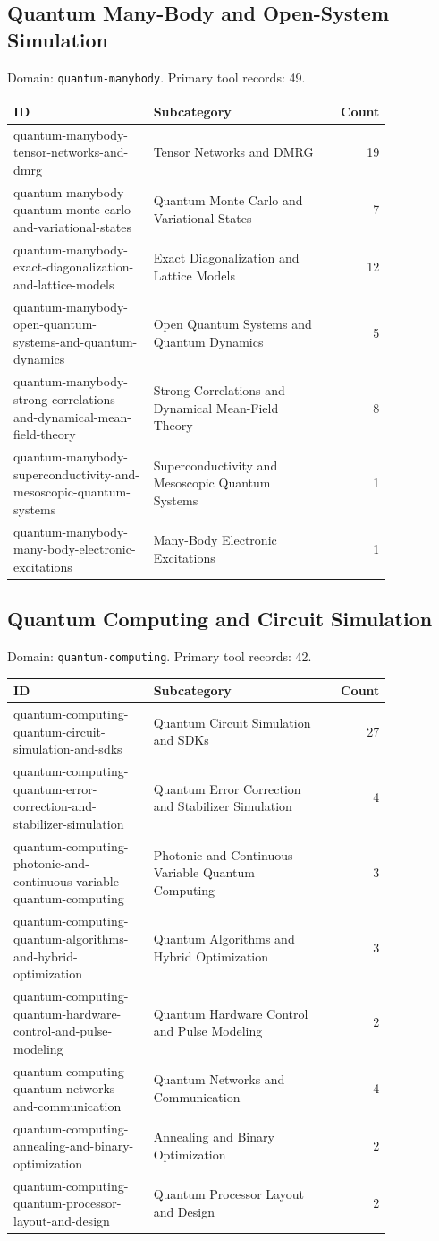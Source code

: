 \subsection{Quantum Many-Body and Open-System Simulation}
\noindent Domain: \texttt{quantum-manybody}. Primary tool records: 49.
\begin{longtable}{p{0.37\linewidth}p{0.47\linewidth}r}
ID & Subcategory & Count\\\hline\endhead
quantum-manybody-tensor-networks-and-dmrg & Tensor Networks and DMRG & 19\\
quantum-manybody-quantum-monte-carlo-and-variational-states & Quantum Monte Carlo and Variational States & 7\\
quantum-manybody-exact-diagonalization-and-lattice-models & Exact Diagonalization and Lattice Models & 12\\
quantum-manybody-open-quantum-systems-and-quantum-dynamics & Open Quantum Systems and Quantum Dynamics & 5\\
quantum-manybody-strong-correlations-and-dynamical-mean-field-theory & Strong Correlations and Dynamical Mean-Field Theory & 8\\
quantum-manybody-superconductivity-and-mesoscopic-quantum-systems & Superconductivity and Mesoscopic Quantum Systems & 1\\
quantum-manybody-many-body-electronic-excitations & Many-Body Electronic Excitations & 1\\
\end{longtable}
\subsection{Quantum Computing and Circuit Simulation}
\noindent Domain: \texttt{quantum-computing}. Primary tool records: 42.
\begin{longtable}{p{0.37\linewidth}p{0.47\linewidth}r}
ID & Subcategory & Count\\\hline\endhead
quantum-computing-quantum-circuit-simulation-and-sdks & Quantum Circuit Simulation and SDKs & 27\\
quantum-computing-quantum-error-correction-and-stabilizer-simulation & Quantum Error Correction and Stabilizer Simulation & 4\\
quantum-computing-photonic-and-continuous-variable-quantum-computing & Photonic and Continuous-Variable Quantum Computing & 3\\
quantum-computing-quantum-algorithms-and-hybrid-optimization & Quantum Algorithms and Hybrid Optimization & 3\\
quantum-computing-quantum-hardware-control-and-pulse-modeling & Quantum Hardware Control and Pulse Modeling & 2\\
quantum-computing-quantum-networks-and-communication & Quantum Networks and Communication & 4\\
quantum-computing-annealing-and-binary-optimization & Annealing and Binary Optimization & 2\\
quantum-computing-quantum-processor-layout-and-design & Quantum Processor Layout and Design & 2\\
\end{longtable}
